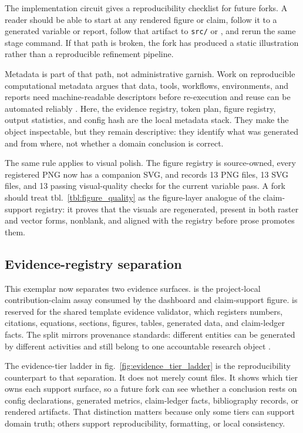 \documentclass[
  english,
]{article}
\begin{document}
The implementation circuit gives a reproducibility checklist for future
forks. A reader should be able to start at any rendered figure or claim,
follow it to a generated variable or report, follow that artifact to
\texttt{src/} or , and rerun the same
stage command. If that path is broken, the fork has produced a static
illustration rather than a reproducible refinement pipeline.

Metadata is part of that path, not administrative garnish. Work on
reproducible computational metadata argues that data, tools, workflows,
environments, and reports need machine-readable descriptors before
re-execution and reuse can be automated reliably
\citep{chen2021metadata}. Here, the evidence registry, token plan,
figure registry, output statistics, and config hash are the local
metadata stack. They make the object inspectable, but they remain
descriptive: they identify what was generated and from where, not
whether a domain conclusion is correct.

The same rule applies to visual polish. The figure registry is
source-owned, every registered PNG now has a companion SVG, and
 records 13 PNG
files, 13 SVG files, and 13 passing visual-quality checks for the
current variable pass. A fork should treat tbl.~\ref{tbl:figure_quality}
as the figure-layer analogue of the claim-support registry: it proves
that the visuals are regenerated, present in both raster and vector
forms, nonblank, and aligned with the registry before prose promotes
them.

\subsection{Evidence-registry
separation}\label{evidence-registry-separation}

This exemplar now separates two evidence surfaces.
 is the
project-local contribution-claim assay consumed by the dashboard and
claim-support figure.  is
reserved for the shared template evidence validator, which registers
numbers, citations, equations, sections, figures, tables, generated
data, and claim-ledger facts. The split mirrors provenance standards:
different entities can be generated by different activities and still
belong to one accountable research object
\citep{moreau2013prov, belhajjame2015ontologies}.

The evidence-tier ladder in fig.~\ref{fig:evidence_tier_ladder} is the
reproducibility counterpart to that separation. It does not merely count
files. It shows which tier owns each support surface, so a future fork
can see whether a conclusion rests on config declarations, generated
metrics, claim-ledger facts, bibliography records, or rendered
artifacts. That distinction matters because only some tiers can support
domain truth; others support reproducibility, formatting, or local
consistency.
\end{document}
